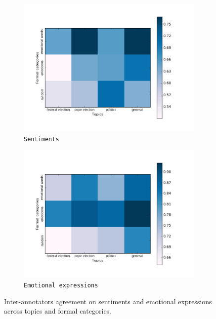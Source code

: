 \begin{figure}[htbp!]
{
\centering
\begin{subfigure}{.5\textwidth}
  \centering
  \includegraphics[width=\linewidth]{img/sentiment_agreement.png}
  \caption{\texttt{Sentiments}}
\end{subfigure}%
\begin{subfigure}{.5\textwidth}
  \centering
  \includegraphics[width=\linewidth]{img/emo-expression_agreement.png}
  \caption{\texttt{Emotional expressions}}
\end{subfigure}
}
\caption{Inter-annotators agreement on sentiments and emotional
  expressions across topics and formal categories.}\label{fig:distr}
\end{figure}

